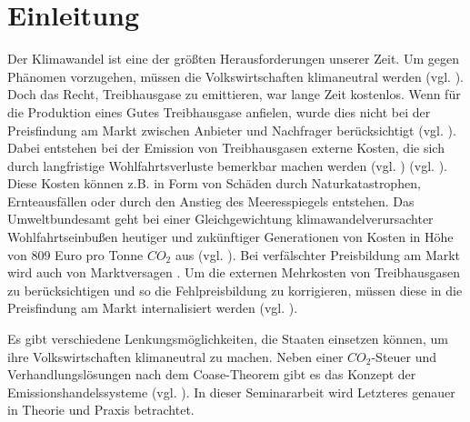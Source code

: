\chapter{Einleitung}

Der Klimawandel ist eine der größten Herausforderungen unserer Zeit. Um gegen Phänomen vorzugehen, müssen die Volkswirtschaften klimaneutral werden (vgl. \cite[S. 162]{hubert.2020}).
Doch das Recht, Treibhausgase zu emittieren, war lange Zeit kostenlos. Wenn für die Produktion eines Gutes Treibhausgase anfielen, wurde dies nicht bei der Preisfindung am Markt zwischen Anbieter und Nachfrager berücksichtigt (vgl. \cite[S. 161]{hubert.2020}).
Dabei entstehen bei der Emission von Treibhausgasen externe Kosten, die sich durch langfristige Wohlfahrtsverluste bemerkbar machen werden (vgl. \cite[S. 25]{rabe.2018}) (vgl. \cite{ub4.2023}).
Diese Kosten können z.B. in Form von Schäden durch Naturkatastrophen, Ernteausfällen oder durch den Anstieg des Meeresspiegels entstehen.
Das Umweltbundesamt geht bei einer Gleichgewichtung klimawandelverursachter Wohlfahrtseinbußen heutiger und zukünftiger Generationen von Kosten in Höhe von 809 Euro pro Tonne $CO_2$ aus (vgl. \cite{ub4.2023}).
Bei verfälschter Preisbildung am Markt wird auch von Marktversagen .
Um die externen Mehrkosten von Treibhausgasen zu berücksichtigen und so die Fehlpreisbildung zu korrigieren, müssen diese in die Preisfindung am Markt internalisiert werden (vgl. \cite[S. 161]{hubert.2020}).

Es gibt verschiedene Lenkungsmöglichkeiten, die Staaten einsetzen können, um ihre Volkswirtschaften klimaneutral zu machen.
Neben einer $CO_2$-Steuer und Verhandlungslösungen nach dem Coase-Theorem gibt es das Konzept der Emissionshandelssysteme (vgl. \cite[S. 161]{hubert.2020}).
In dieser Seminararbeit wird Letzteres genauer in Theorie und Praxis betrachtet.
